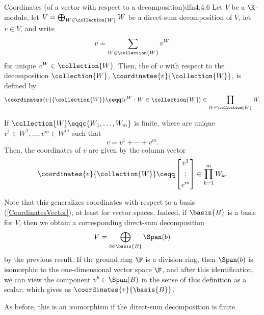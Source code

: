 \begin{dfn}{Coordinates (of a vector with respect to a decomposition)}{dfn4.4.6}
	Let $V$ be a $\K$-module, let $V=\bigoplus _{W\in \collection{W}}W$ be a direct-sum decomposition of $V$, let $v\in V$, and write
	\begin{equation}
	v=\sum _{W\in \collection{W}}v^W
	\end{equation}
	for unique $v^W\in \collection{W}$.  Then, the  of $v$ with respect to the decomposition $\collection{W}$, $\coordinates{v}{\collection{W}}$, is defined by
	\begin{equation}
	\coordinates{v}{\collection{W}}\ceqq \langle v^W:W\in \collection{W}\rangle \in \prod _{W\in \collection{W}}W.
	\end{equation}
	\begin{rmk}
		If $\collection{W}\eqqc \{ W_1,\ldots ,W_m\}$ is finite, where are unique $v^1\in W^1,\ldots ,v^m\in W^m$ such that
		\begin{equation}
		v=v^1+\cdots +v^m.
		\end{equation}
		Then, the coordinates of $v$ are given by the column vector
		\begin{equation}
		\coordinates{v}{\collection{W}}\ceqq \begin{bmatrix}v^1 \\ \vdots \\ v^m\end{bmatrix}\in \prod _{k=1}^mW_k.
		\end{equation}
	\end{rmk}
	\begin{rmk}
		Note that this generalizes coordinates with respect to a basis (\cref{CoordinatesVector}), at least for vector spaces.  Indeed, if $\basis{B}$ is a basis for $V$, then we obtain a corresponding direct-sum decomposition
		\begin{equation}
		V=\bigoplus _{b\in \basis{B}}\Span (b)
		\end{equation}
		by the previous result.  If the ground ring $\F$ is a division ring, then $\Span (b)$ is isomorphic to the one-dimensional vector space $\F$, and after this identification, we can view the component $v^b\in \Span (B)$ in the sense of this definition as a scalar, which gives us $\coordinates{v}{\basis{B}}$.
	\end{rmk}
\end{dfn}
As before, this is an isomorphism if the direct-sum decomposition is finite.

